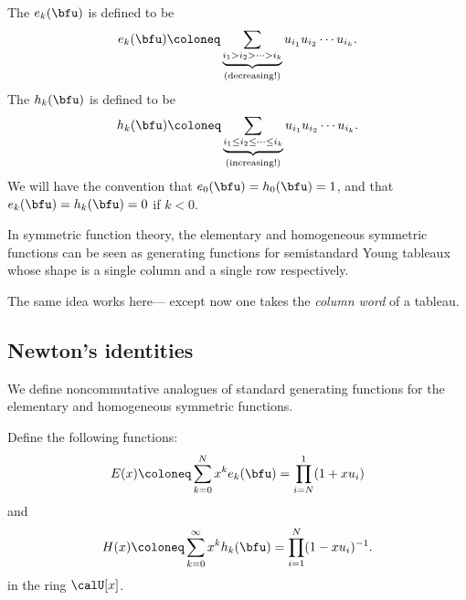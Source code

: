 \documentclass{article}
\begin{document}
\begin{definition}
    The  $e_k(\bfu)$ is defined to be
    \begin{equation}
        \label{eqn:ncElementaryDef}
        e_k(\bfu)
        \coloneq
        \underbrace{
            \sum_{i_1 > i_2 > \cdots > i_k}
        }_{\text{(decreasing!)}}
        u_{i_1} u_{i_2} \cdots u_{i_k}. 
    \end{equation}
    The  $h_k(\bfu)$ is defined to be
    \begin{equation}
        \label{eqn:ncHomogeneousDef}
        h_k(\bfu)
        \coloneq
        \underbrace{
            \sum_{i_1 \leq i_2 \leq \cdots \leq i_k}
        }_{\text{(increasing!)}}
        u_{i_1} u_{i_2} \cdots u_{i_k}. 
    \end{equation}
    We will have the convention that $e_0(\bfu) = h_0(\bfu) = 1$, and that $e_k(\bfu) = h_k(\bfu) = 0$ if $k < 0$.
\end{definition}

In symmetric function theory, the elementary and homogeneous symmetric functions can be seen as generating functions for semistandard Young tableaux whose shape is a single column and a single row respectively.

The same idea works here--- except now one takes the \textit{column word} of a tableau.

\subsection{
    Newton's identities
}

We define noncommutative analogues of standard generating functions for the elementary and homogeneous symmetric functions.

\begin{definition}
    Define the following functions:
    \begin{equation}
        \label{eqn:colGenFunc}
        E(x)
        \coloneq
        \sum_{k=0}^N
        x^k e_k(\bfu)
        =
        \prod_{i=N}^1
        (1+xu_i)
    \end{equation}
    and
    \begin{equation}
        \label{eqn:rowGenFunc}
        H(x)
        \coloneq
        \sum_{k=0}^\infty
        x^k h_k(\bfu)
        =
        \prod_{i=1}^N
        (1-xu_i)^{-1}.
    \end{equation}
    in the ring $\calU[x]$.
\end{definition}
\end{document}
